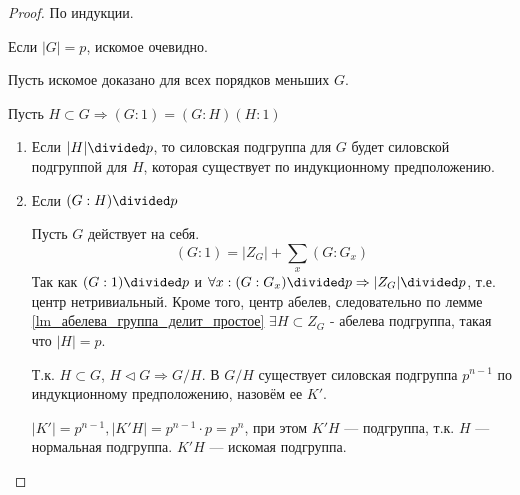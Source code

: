 \begin{proof}
    По индукции.

    Если \(|G| = p\), искомое очевидно.

    Пусть искомое доказано для всех порядков меньших \(G\).

    Пусть \(H \subset G \Rightarrow (G : 1) = (G : H)(H : 1)\)

    \begin{enumerate}
        \item Если \(|H| \divided p\), то силовская подгруппа для \(G\) будет силовской подгруппой для \(H\), которая существует по индукционному предположению.
        \item Если \((G : H) \divided p\)

              Пусть \(G\) действует на себя.
              \[(G : 1) = |Z_G| + \sum_x (G : G_x) \]
              Так как \((G : 1) \divided p\) и \(\forall x : (G : G_x) \divided p \Rightarrow |Z_G| \divided p\), т.е. центр нетривиальный. Кроме того, центр абелев, следовательно по лемме \ref{lm_абелева_группа_делит_простое} \(\exists H \subset Z_G\) - абелева подгруппа, такая что \(|H| = p\).

              Т.к. \(H \subset G\), \(H \vartriangleleft G \Rightarrow G/H\). В \(G / H\) существует силовская подгруппа \(p^{n-1}\) по индукционному предположению, назовём ее \(K'\).

              \(|K'|= p^{n-1}, |K'H| = p^{n-1} \cdot p = p^n\), при этом \(K'H\) --- подгруппа, т.к. \(H\) --- нормальная подгруппа. \(K'H\) --- искомая подгруппа.
    \end{enumerate}
\end{proof}
